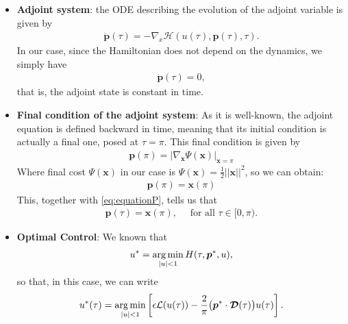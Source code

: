 \begin{itemize}
    \item[1.] \textbf{Adjoint system}: the ODE describing the evolution of the adjoint variable is given by 
    \begin{align*}
    	\dot{\bm{p}}(\tau) = -\nabla_x \mathcal{H}(u(\tau),\bm{p}(\tau),\tau).
    \end{align*}
    In our case, since the Hamiltonian does not depend on the dynamics, we simply have
    \begin{align}\label{eq:equationP}
    	\dot{\bm{p}}(\tau) = 0,
    \end{align}
	that is, the adjoint state is constant in time.
	
	\item[2.] \textbf{Final condition of the adjoint system}: As it is well-known, the adjoint equation is defined backward in time, meaning that its initial condition is actually a final one, posed at $\tau=\pi$. This final condition is given by 
    \begin{align*}
    	\bm{p}(\pi) = | \nabla_{\bm{x}} \Psi(\bm{x}) |_{\bm{x} = \pi}
    \end{align*} 
    Where final cost $\Psi(\bm{x})$ in our case is $\Psi(\bm{x}) = \frac{1}{2}||\bm{x}||^2$, so  we can obtain:
    \begin{gather}
        \bm{p}(\pi) = \bm{x}(\pi)
    \end{gather}
	This, together with \eqref{eq:equationP}, tells us that
	\begin{align*}
		\bm{p}(\tau) = \bm{x}(\pi), \quad \mbox{ for all }\tau\in [0,\pi).
	\end{align*} 
    
    \item[3.] \textbf{Optimal  Control}: We known that 
    \begin{align*}
    	u^* = \operatorname*{arg\,min}_{|u|<1} H(\tau,\bm{p}^*,u),
    \end{align*}
	so that, in this case, we can write
    \begin{gather}
        u^*(\tau) = \operatorname*{arg\,min}_{|u|<1}  \left[\epsilon \mathcal{L}(u(\tau)) - \frac 2\pi \big(\bm{p}^* \cdot \bm{\mathcal{D}}(\tau)\big) u(\tau) \right].
    \end{gather}
\end{itemize}

